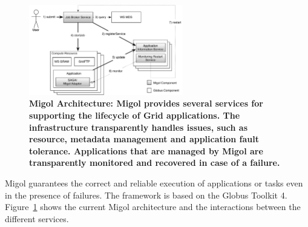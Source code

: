 \documentclass[times, 10pt, twocolumn]{article}
\begin{document}

\label{sec:migol}

\begin{figure}[t]
 \centering
 \includegraphics[width=0.6\textwidth]{migol_architecture}
 \caption{\small \bf Migol Architecture: Migol provides several services for
 supporting the lifecycle of Grid applications. The infrastructure
 transparently handles issues, such as resource, metadata management
 and application fault tolerance.  Applications that are managed by
 Migol are transparently monitored and recovered in case of a
 failure.}
 \label{fig:migol_architecture} 
\end{figure}           


Migol guarantees the correct and reliable exe\-cution of applications or tasks even in
the presence of  failures. The framework is based on the Globus Toolkit 4. 
Figure~\ref{fig:migol_architecture} shows the current Migol architecture and 
the interactions between the different services.
\end{document}
